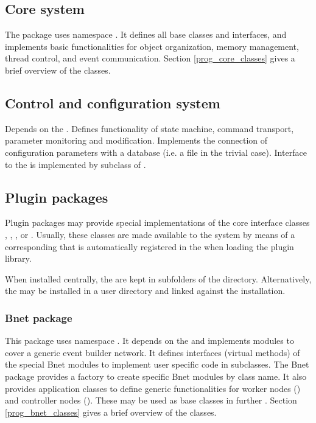 \subsection{Core system}
The  package uses namespace .
It defines all base classes and interfaces, 
and implements basic functionalities for object organization, memory management, 
thread control, and event communication. Section \ref{prog_core_classes} gives a brief overview of the
  classes.
   

\subsection{Control and configuration system}
   Depends on the . Defines 
   functionality of state machine, command transport, parameter 
   monitoring and modification. Implements the 
   connection of configuration parameters with a database 
   (i.e. a file in the trivial case). Interface to the  is 
   implemented by subclass of .

                
\subsection{Plugin packages}
Plugin packages may provide special implementations of the core interface classes 
, , , or
. Usually, these classes are made available to the system by means
of a corresponding  that is automatically registered in the  
when loading the plugin library.

When installed centrally, the  are kept in subfolders of the   directory.
Alternatively, the  may be installed in a user directory and linked against the
 installation.

\subsubsection{Bnet package}
   This package uses namespace . It depends on the  and implements 
   modules to cover a generic event builder network. 
   It defines interfaces (virtual methods) of the special Bnet modules to 
   implement user specific code in subclasses. The Bnet package provides a 
   factory to create specific Bnet modules by class name. It also 
   provides application classes to define generic functionalities for 
   worker nodes () and 
   controller nodes (). These may be used as base classes
   in further .
   Section \ref{prog_bnet_classes} gives a brief overview of the
 classes.   
   
